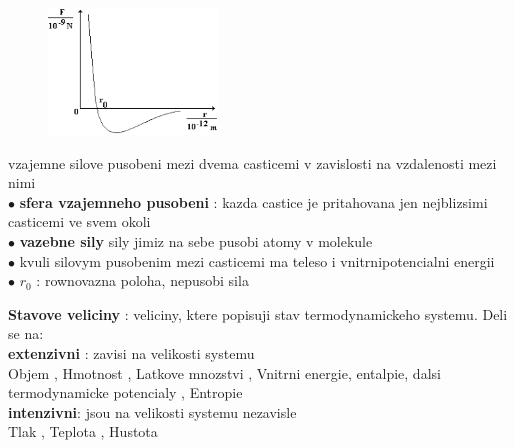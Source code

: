 \documentclass{report}
\begin{document}
\begin{figure}
  \includegraphics[width=0.4\textwidth]{kinetic_theory.png}
\end{figure} 
vzajemne silove pusobeni mezi dvema casticemi v zavislosti na vzdalenosti mezi nimi  \\[10pt]
  $\bullet$ \textbf{sfera vzajemneho pusobeni} : kazda castice je pritahovana jen nejblizsimi casticemi ve svem okoli \\
  $\bullet$ \textbf{vazebne sily}  sily jimiz na sebe pusobi atomy v molekule \\
  $\bullet$ kvuli silovym pusobenim mezi casticemi ma teleso i vnitrnipotencialni energii\\
  $\bullet$ $r_0$ : rownovazna poloha, nepusobi sila \\
  \vspace{2cm}
  
  \textbf{Stavove veliciny} : veliciny, ktere popisuji stav termodynamickeho systemu. Deli se na: \\
  \textbf{extenzivni} : zavisi na velikosti systemu \\
    Objem ,
    Hmotnost , 
    Latkove mnozstvi ,
    Vnitrni energie, entalpie, dalsi termodynamicke potencialy , 
    Entropie \\
  
  \textbf{intenzivni}: jsou na velikosti systemu nezavisle \\
    Tlak ,
    Teplota ,
    Hustota \\ 
\end{document}
